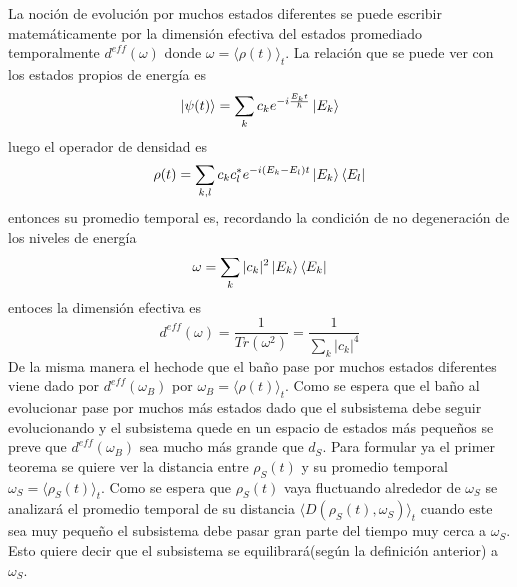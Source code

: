 La noción de evolución por muchos estados diferentes se puede escribir matemáticamente por la dimensión efectiva del estados promediado temporalmente $d^{eff}(\omega)$ donde $\omega=\langle \rho(t) \rangle_{t}$. La relación que se puede ver con los estados propios de energía es 
\begin{equation}
\ket{\psi(t)} = \sum_{k} c_{k} e^{-i\frac{E_{k}t}{\hbar}} \ket{E_{k}}
\end{equation}
luego el operador de densidad es 
\begin{equation}
\rho(t)=\sum_{k,l} c_{k} c_{l}^{*} e^{-i(E_{k}-E_{l})t}\ket{E_{k}} \bra{E_{l}}
\end{equation}
entonces su promedio temporal es, recordando la condición de no degeneración de los niveles de energía
\begin{equation}
\omega= \sum_{k} |c_{k}|^{2} \ket{E_{k}} \bra{E_{k}}
\end{equation}
entoces la dimensión efectiva es 
\begin{equation}
d^{eff}(\omega)=\frac{1}{Tr(\omega^{2})}=\frac{1}{\sum_{k} |c_{k}|^{4} }
\end{equation}
De la misma manera el hechode que el baño pase por muchos estados diferentes viene dado por $d^{eff}(\omega_{B})$ por $\omega_{B}=\langle \rho(t) \rangle_{t}$. Como se espera que el baño al evolucionar pase por muchos más estados dado que el subsistema debe seguir evolucionando y el subsistema quede en un espacio de estados más pequeños se preve que $d^{eff}(\omega_{B})$ sea mucho más grande que $d_{S}$. Para formular ya el primer teorema se quiere ver la distancia entre $\rho_{S}(t)$ y su promedio temporal $\omega_{S}= \langle \rho_{S}(t) \rangle_{t}$. Como se espera que $\rho_{S}(t) $ vaya fluctuando alrededor de $\omega_{S}$ se analizará el promedio temporal de su distancia $\langle D(\rho_{S}(t) ,\omega_{S}) \rangle_{t}$ cuando este sea muy pequeño el subsistema debe pasar gran parte del tiempo muy cerca a $\omega_{S}$. Esto quiere decir que el subsistema se equilibrará(según la definición anterior) a $\omega_{S}$.




